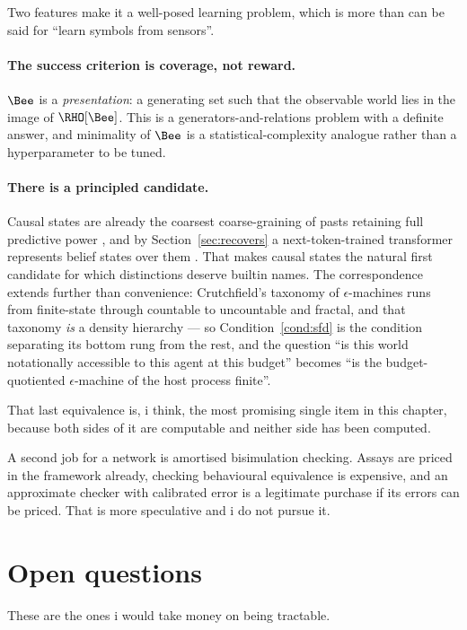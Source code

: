 Two features make it a well-posed learning problem, which is more
than can be said for ``learn symbols from sensors''.

\paragraph{The success criterion is coverage, not reward.}
$\Bee$ is a \emph{presentation}: a generating set such that the
observable world lies in the image of $\RHO[\Bee]$.
This is a generators-and-relations problem with a definite answer,
and minimality of $\Bee$ is a statistical-complexity analogue
rather than a hyperparameter to be tuned.

\paragraph{There is a principled candidate.}
Causal states are already the coarsest coarse-graining of pasts
retaining full predictive power \cite{shalizi2001}, and by
Section~\ref{sec:recovers} a next-token-trained transformer
represents belief states over them \cite{shai2024}.
That makes causal states the natural first candidate for which
distinctions deserve builtin names.
The correspondence extends further than convenience: Crutchfield's
taxonomy of $\epsilon$-machines runs from finite-state through
countable to uncountable and fractal, and that taxonomy \emph{is} a
density hierarchy --- so Condition~\ref{cond:sfd} is the condition
separating its bottom rung from the rest, and the question ``is
this world notationally accessible to this agent at this budget''
becomes ``is the budget-quotiented $\epsilon$-machine of the host
process finite''.

That last equivalence is, i think, the most promising single item
in this chapter, because both sides of it are computable and
neither side has been computed.

A second job for a network is amortised bisimulation checking.
Assays are priced in the framework already, checking behavioural
equivalence is expensive, and an approximate checker with
calibrated error is a legitimate purchase if its errors can be
priced.
That is more speculative and i do not pursue it.

\section{Open questions}
\label{sec:notation-open}

These are the ones i would take money on being tractable.

